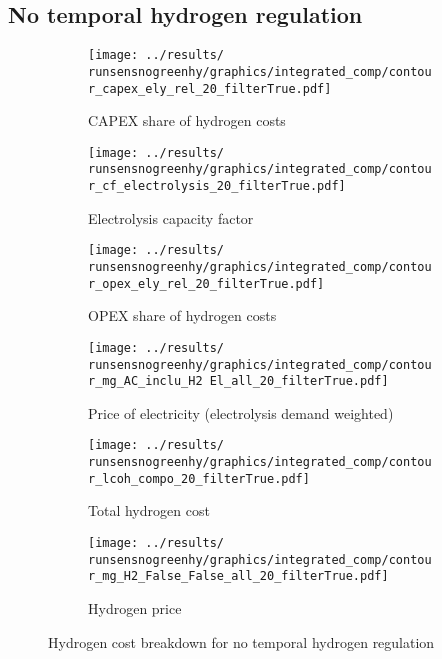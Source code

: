 \subsection{No temporal hydrogen regulation}

\begin{figure*}[h!]
    \centering
    \begin{subfigure}[b]{0.45\linewidth}
        \centering
        \texttt{[image: ../results/\\runsensnogreenhy/graphics/integrated\_comp/contour\_capex\_ely\_rel\_20\_filterTrue.pdf]}
        \caption{CAPEX share of hydrogen costs}
        \label{fig:capex-rel}
    \end{subfigure}
    \hfill
    \begin{subfigure}[b]{0.45\linewidth}
        \centering
        \texttt{[image: ../results/\\runsensnogreenhy/graphics/integrated\_comp/contour\_cf\_electrolysis\_20\_filterTrue.pdf]}
        \caption{Electrolysis capacity factor}
        \label{fig:ely-cf}
    \end{subfigure}
    \hfill
    \begin{subfigure}[b]{0.45\linewidth}
        \centering
        \texttt{[image: ../results/\\runsensnogreenhy/graphics/integrated\_comp/contour\_opex\_ely\_rel\_20\_filterTrue.pdf]}
        \caption{OPEX share of hydrogen costs}
        \label{fig:opex-rel}
    \end{subfigure}
    \hfill
    \begin{subfigure}[b]{0.45\linewidth}
        \centering
        \texttt{[image: ../results/\\runsensnogreenhy/graphics/integrated\_comp/contour\_mg\_AC\_inclu\_H2 El\_all\_20\_filterTrue.pdf]}
        \caption{Price of electricity (electrolysis demand weighted)}
        \label{fig:electricity-price}
    \end{subfigure}
    \hfill
    \begin{subfigure}[b]{0.45\linewidth}
        \centering
        \texttt{[image: ../results/\\runsensnogreenhy/graphics/integrated\_comp/contour\_lcoh\_compo\_20\_filterTrue.pdf]}
        \caption{Total hydrogen cost}
        \label{fig:hydrogen-cost}
    \end{subfigure}
    \hfill
    \begin{subfigure}[b]{0.45\linewidth}
        \centering
        \texttt{[image: ../results/\\runsensnogreenhy/graphics/integrated\_comp/contour\_mg\_H2\_False\_False\_all\_20\_filterTrue.pdf]}
        \caption{Hydrogen price}
        \label{fig:hydrogen-price}
    \end{subfigure}
    \hfill
    
    \caption{Hydrogen cost breakdown for no temporal hydrogen regulation}
    \label{fig:electrolysis_op_comp}
\end{figure*}


\clearpage